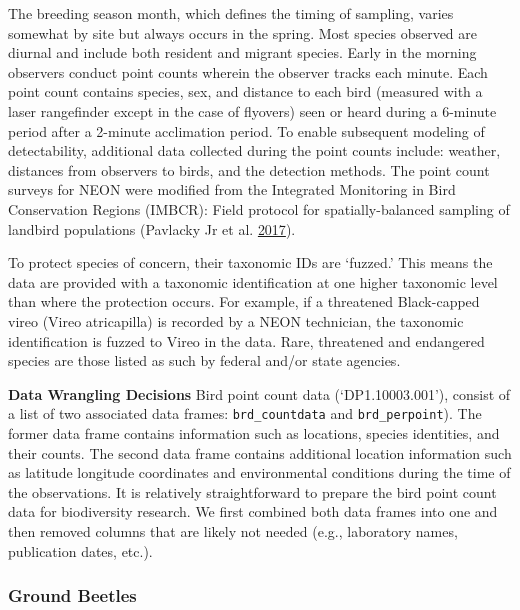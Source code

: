 \documentclass[
  12pt,
]{article}
\begin{document}
The breeding season month, which defines the timing of sampling, varies somewhat by site but always occurs in the spring. Most species observed are diurnal and include both resident and migrant species. Early in the morning observers conduct point counts wherein the observer tracks each minute. Each point count contains species, sex, and distance to each bird (measured with a laser rangefinder except in the case of flyovers) seen or heard during a 6-minute period after a 2-minute acclimation period. To enable subsequent modeling of detectability, additional data collected during the point counts include: weather, distances from observers to birds, and the detection methods. The point count surveys for NEON were modified from the Integrated Monitoring in Bird Conservation Regions (IMBCR): Field protocol for spatially-balanced sampling of landbird populations (Pavlacky Jr et al. \protect\hyperlink{ref-pavlacky2017statistically}{2017}).

To protect species of concern, their taxonomic IDs are `fuzzed.' This means the data are provided with a taxonomic identification at one higher taxonomic level than where the protection occurs. For example, if a threatened Black-capped vireo (Vireo atricapilla) is recorded by a NEON technician, the taxonomic identification is fuzzed to Vireo in the data. Rare, threatened and endangered species are those listed as such by federal and/or state agencies.

\textbf{Data Wrangling Decisions} Bird point count data (`DP1.10003.001'), consist of a list of two associated data frames: \texttt{brd\_countdata} and \texttt{brd\_perpoint}). The former data frame contains information such as locations, species identities, and their counts. The second data frame contains additional location information such as latitude longitude coordinates and environmental conditions during the time of the observations. It is relatively straightforward to prepare the bird point count data for biodiversity research. We first combined both data frames into one and then removed columns that are likely not needed (e.g., laboratory names, publication dates, etc.).

\hypertarget{ground-beetles}{%
\subsubsection{Ground Beetles}\label{ground-beetles}}
\end{document}
